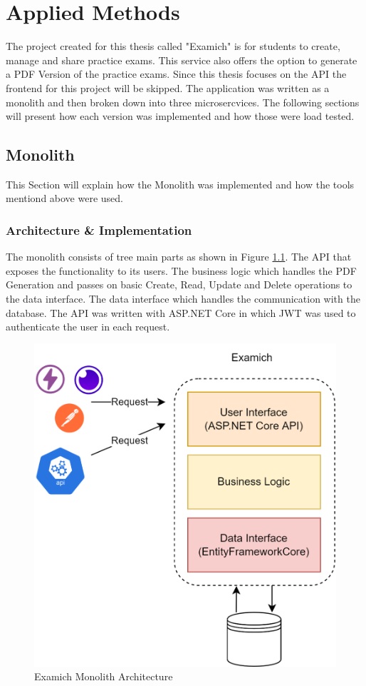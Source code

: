 \documentclass[BIF,Bachelor,nenglish]{twbook}%
\begin{document}
\clearpage
\chapter{Applied Methods}
The project created for this thesis called "Examich" is for students to create, manage and share practice exams. This service also offers the option to generate a PDF Version of the practice exams. Since this thesis focuses on the API the frontend for this project will be skipped. The application was written as a monolith and then broken down into three microsercvices. The following sections will present how each version was implemented and how those were load tested.

\section{Monolith}
This Section will explain how the Monolith was implemented and how the tools mentiond above were used.

\subsection{Architecture \& Implementation}
The monolith consists of tree main parts as shown in Figure \ref{examichMonolith}. The API that exposes the functionality to its users. The business logic which handles the PDF Generation and passes on basic Create, Read, Update and Delete operations to the data interface. The data interface which handles the communication with the database. The API was written with ASP.NET Core in which JWT was used to authenticate the user in each request.
\begin{figure} [H]
 \begin{center}
    \includegraphics[width=0.6\linewidth]{img/ExamichMonolith.png}
 \end{center}
 \caption{Examich Monolith Architecture}
 \label{examichMonolith}
\end{figure}
\noindent
\end{document}
